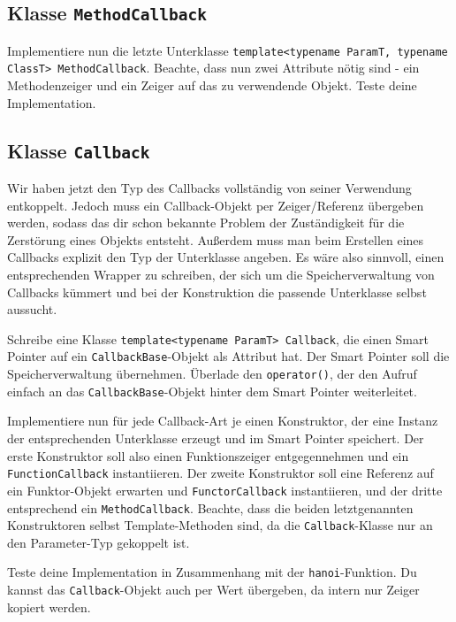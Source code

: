 \subsection{Klasse \lstinline{MethodCallback}}
Implementiere nun die letzte Unterklasse \lstinline{template<typename ParamT, typename ClassT> MethodCallback}.
Beachte, dass nun zwei Attribute nötig sind - ein Methodenzeiger und ein Zeiger auf das zu verwendende Objekt.
Teste deine Implementation.



\subsection{Klasse \lstinline{Callback}}
Wir haben jetzt den Typ des Callbacks vollständig von seiner Verwendung entkoppelt.
Jedoch muss ein Callback-Objekt per Zeiger/Referenz übergeben werden, sodass das dir schon bekannte Problem der Zuständigkeit für die Zerstörung eines Objekts entsteht.
Außerdem muss man beim Erstellen eines Callbacks explizit den Typ der Unterklasse angeben.
Es wäre also sinnvoll, einen entsprechenden Wrapper zu schreiben, der sich um die Speicherverwaltung von Callbacks kümmert und bei der Konstruktion die passende Unterklasse selbst aussucht.

Schreibe eine Klasse \lstinline{template<typename ParamT> Callback}, die einen Smart Pointer auf ein \lstinline{CallbackBase}-Objekt als Attribut hat. Der Smart Pointer soll die Speicherverwaltung übernehmen. Überlade den \lstinline{operator()}, der den Aufruf einfach an das \lstinline{CallbackBase}-Objekt hinter dem Smart Pointer weiterleitet.

Implementiere nun für jede Callback-Art je einen Konstruktor, der eine Instanz der entsprechenden Unterklasse erzeugt und im Smart Pointer speichert.
Der erste Konstruktor soll also einen Funktionszeiger entgegennehmen und ein \lstinline{FunctionCallback} instantiieren.
Der zweite Konstruktor soll eine Referenz auf ein Funktor-Objekt erwarten und  \lstinline{FunctorCallback} instantiieren, und der dritte entsprechend ein \lstinline{MethodCallback}.
Beachte, dass die beiden letztgenannten Konstruktoren selbst Template-Methoden sind, da die \lstinline{Callback}-Klasse nur an den Parameter-Typ gekoppelt ist.

Teste deine Implementation in Zusammenhang mit der \lstinline{hanoi}-Funktion. Du kannst das \lstinline{Callback}-Objekt auch per Wert übergeben, da intern nur Zeiger kopiert werden.
